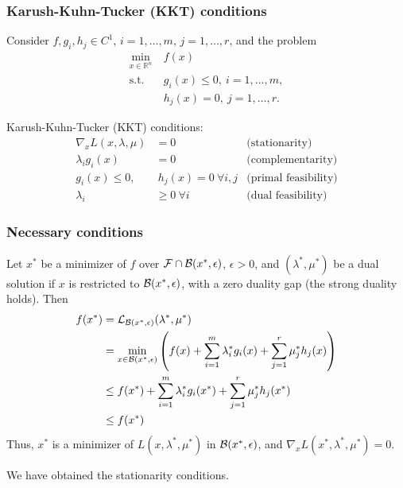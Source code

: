 \documentclass[usepdftitle=false,aspectratio=169]{beamer}
\begin{document}
\begin{frame}
	\frametitle{Karush-Kuhn-Tucker (KKT) conditions}
	
	Consider $f, g_i, h_j \in C^1$, $i = 1,\ldots,m$, $j = 1,\ldots,r$, and the problem
	\begin{align*}
		\min_{x \in \mathbb{R}^n} \ & f(x) \\
		\mbox{s.t. } & g_i(x) \leq 0,\ i = 1,\ldots,m, \\
		& h_j(x) = 0,\ j = 1,\ldots,r.
	\end{align*}
	
	Karush-Kuhn-Tucker (KKT) conditions:
	\begin{align*}
		\nabla_x L(x,\lambda,\mu) &= 0 & \mbox{(stationarity)}\\
		\lambda_i g_i(x) &= 0 & \mbox{(complementarity)} \\
		g_i(x) \leq 0, &\ h_j(x) = 0\ \forall i,j & \mbox{(primal feasibility)} \\
		\lambda_i &\geq 0\ \forall i & \mbox{(dual feasibility)}
	\end{align*}
	
\end{frame}

\begin{frame}
	\frametitle{Necessary conditions}
	
	Let $x^*$ be a minimizer of $f$ over ${\mathcal{F}} \cap {\mathcal{B}}(x^*,\epsilon)$, $\epsilon > 0$, and $(\lambda^*, \mu^*)$ be a dual solution if $x$ is restricted to ${\mathcal{B}}(x^*,\epsilon)$, with a zero duality gap (the strong duality holds). Then
	\begin{align*}
		f(x^*) &= {\mathcal{L}}_{{\mathcal{B}}(x^*, \epsilon)}(\lambda^*, \mu^*) \\
		&= \min_{x \in {\mathcal{B}}(x^*,\epsilon)} \left( f(x) + \sum_{i = 1}^m \lambda_i^* g_i(x) + \sum_{j = 1}^r \mu_j^* h_j(x) \right) \\
		& \leq f(x^*) + \sum_{i = 1}^m \lambda_i^* g_i(x^*) + \sum_{j = 1}^r \mu_j^* h_j(x^*) \\
		& \leq f(x^*)
	\end{align*}
	Thus, $x^*$ is a minimizer of $L(x, \lambda^*, \mu^*)$ in ${\mathcal{B}}(x^*,\epsilon)$, and $\nabla_x L(x^*, \lambda^*, \mu^*) = 0$.
	
	\mbox{}
	
We have obtained the stationarity conditions.
	
\end{frame}
\end{document}
